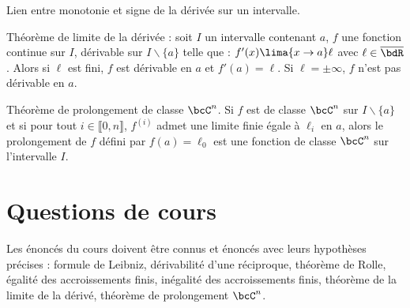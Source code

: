 \documentclass[a4paper,french,bookmarks]{article}
\begin{document}
\begin{enumerate}
    \ithand Lien entre monotonie et signe de la dérivée sur un intervalle.
    
    \ithand Théorème de limite de la dérivée : soit $I$ un intervalle contenant $a$, $f$ une fonction continue sur $I$, dérivable sur $I \backslash \{a\}$ telle que : $f'(x) \lima{x \to a} \ell$ avec $\ell \in \overline\bdR$. Alors si $\ell$ est fini, $f$ est dérivable en $a$ et $f'(a) = \ell$. Si $\ell = \pm \infty$, $f$ n'est pas dérivable en $a$.

    \ithand Théorème de prolongement de classe $\bcC^n$. Si $f$ est de classe $\bcC^n$ sur $I \backslash \{a\}$ et si pour tout $i \in \llbracket 0, n\rrbracket$, $f^{(i)}$ admet une limite finie égale à $\ell_i$ en $a$, alors le prolongement de $f$ défini par $f(a) = \ell_0$ est une fonction de classe $\bcC^n$ sur l'intervalle $I$.
\end{enumerate}

\section*{\centering\EBGaramond\Large Questions de cours}

Les énoncés du cours doivent être connus et énoncés avec leurs hypothèses précises : formule de Leibniz, dérivabilité d'une réciproque, théorème de Rolle, égalité des accroissements finis, inégalité des accroissements finis, théorème de la limite de la dérivé, théorème de prolongement $\bcC^n$.
\end{document}
